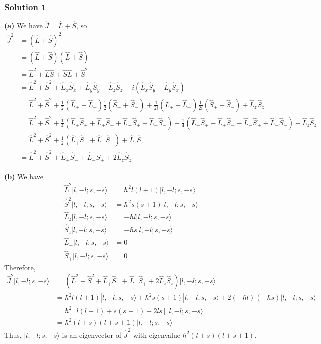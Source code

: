 \documentclass{article}
\begin{document}
\subsubsection{Solution 1}
\textbf{(a)} 
We have $\hat{J} = \hat{L} + \hat{S}$, so
\begin{align*}
\hat{J}^2 &= (\hat{L} + \hat{S})^2 \\
&= (\hat{L} + \hat{S})(\hat{L} + \hat{S}) \\
&= \hat{L}^2 + \hat{L}\hat{S} + \hat{S}\hat{L} + \hat{S}^2 \\
&= \hat{L}^2 + \hat{S}^2 + \hat{L}_x \hat{S}_x + \hat{L}_y \hat{S}_y + \hat{L}_z \hat{S}_z + i(\hat{L}_x \hat{S}_y - \hat{L}_y \hat{S}_x) \\
&= \hat{L}^2 + \hat{S}^2 + \frac{1}{2}(\hat{L}_+ + \hat{L}_-) \frac{1}{2}(\hat{S}_+ + \hat{S}_-) + \frac{1}{2i}(\hat{L}_+ - \hat{L}_-) \frac{1}{2i}(\hat{S}_+ - \hat{S}_-) + \hat{L}_z \hat{S}_z \\
&= \hat{L}^2 + \hat{S}^2 + \frac{1}{4}(\hat{L}_+ \hat{S}_+ + \hat{L}_+ \hat{S}_- + \hat{L}_- \hat{S}_+ + \hat{L}_- \hat{S}_-) - \frac{1}{4}(\hat{L}_+ \hat{S}_+ - \hat{L}_+ \hat{S}_- - \hat{L}_- \hat{S}_+ + \hat{L}_- \hat{S}_-) + \hat{L}_z \hat{S}_z \\
&= \hat{L}^2 + \hat{S}^2 + \frac{1}{2}(\hat{L}_+ \hat{S}_- + \hat{L}_- \hat{S}_+) + \hat{L}_z \hat{S}_z \\
&= \hat{L}^2 + \hat{S}^2 + \hat{L}_+ \hat{S}_- + \hat{L}_- \hat{S}_+ + 2\hat{L}_z \hat{S}_z
\end{align*}

\textbf{(b)} 
We have
\begin{align*}
\hat{L}^2 |l, -l; s, -s\rangle &= \hbar^2 l(l+1) |l, -l; s, -s\rangle \\
\hat{S}^2 |l, -l; s, -s\rangle &= \hbar^2 s(s+1) |l, -l; s, -s\rangle \\
\hat{L}_z |l, -l; s, -s\rangle &= -\hbar l |l, -l; s, -s\rangle \\
\hat{S}_z |l, -l; s, -s\rangle &= -\hbar s |l, -l; s, -s\rangle \\
\hat{L}_+ |l, -l; s, -s\rangle &= 0 \\
\hat{S}_+ |l, -l; s, -s\rangle &= 0
\end{align*}
Therefore,
\begin{align*}
\hat{J}^2 |l, -l; s, -s\rangle &= (\hat{L}^2 + \hat{S}^2 + \hat{L}_+ \hat{S}_- + \hat{L}_- \hat{S}_+ + 2 \hat{L}_z \hat{S}_z) |l, -l; s, -s\rangle \\
&= \hbar^2 l(l+1) |l, -l; s, -s\rangle + \hbar^2 s(s+1) |l, -l; s, -s\rangle + 2 (-\hbar l) (-\hbar s) |l, -l; s, -s\rangle \\
&= \hbar^2 [l(l+1) + s(s+1) + 2ls] |l, -l; s, -s\rangle \\
&= \hbar^2 (l+s)(l+s+1) |l, -l; s, -s\rangle
\end{align*}
Thus, $|l, -l; s, -s\rangle$ is an eigenvector of $\hat{J}^2$ with eigenvalue $\hbar^2 (l+s)(l+s+1)$.
\end{document}
